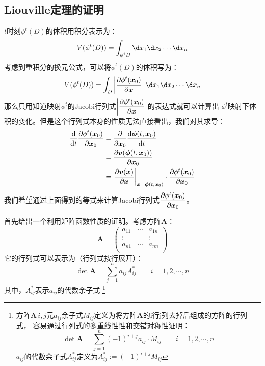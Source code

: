     \subsection{Liouville定理的证明}
    $t$时刻$\phi^t(D)$的体积用积分表示为：
    \begin{equation}
        V(\phi^t(D)) = \int_{\phi^t D}\d x_1\d x_2\cdots\d x_n
    \end{equation}
    考虑到重积分的换元公式，可以将$\phi^t(D)$的体积写为：
    \begin{equation}
        V(\phi^t(D)) = \int_{D}\left|\pdv{\phi^t(\bm{x}_0)}{\bm{x}}\right|\d x_1\d x_2\cdots\d x_n
        \label{volum of D}
    \end{equation}
    那么只用知道映射$\phi^t$的Jacobi行列式$\displaystyle\left|\frac{\partial{\phi^t(\bm{x}_0)}}{\partial{\bm{x}}}\right|$的表达式就可以计算出
    $\phi^t$映射下体积的变化。但是这个行列式本身的性质无法直接看出，我们对其求导：
    \begin{equation}
        \begin{split}
            \frac{\mathrm{d}{}}{\mathrm{d}{t}}\frac{\partial{\phi^t(\bm{x}_0)}}{\partial{\bm{x}_0}} &= \frac{\partial{}}{\partial{\bm{x}_0}}\frac{\mathrm{d}{\bm{\phi}(t, \bm{x}_0)}}{\mathrm{d}{t}}\\
            & = \frac{\partial{\bm{v}(\bm{\phi}(t, \bm{x}_0))}}{\partial{\bm{x}_0}}\\
            & = \left.\frac{\partial{\bm{v}(\bm{x})}}{\partial{\bm{x}}}\right|_{\bm{x}=\bm{\phi}(t, \bm{x}_0)}\cdot
            \frac{\partial{\phi^t(\bm{x}_0)}}{\partial{\bm{x}_0}}
        \end{split}
        \label{the equation of jacobian}
    \end{equation}
    我们希望通过上面得到的等式来计算Jacobi行列式$\displaystyle\frac{\partial{\phi^t(\bm{x}_0)}}{\partial{\bm{x}_0}}$。
    \par 
    首先给出一个利用矩阵函数性质的证明。考虑方阵$\bm{A}$：
    \begin{equation}
        \bm{A} = 
        \begin{pmatrix}
            a_{11} & \cdots & a_{1n}\\
            \vdots & & \vdots\\
            a_{n1} & \cdots & a_{nn}\\
        \end{pmatrix}
    \end{equation}
    它的行列式可以表示为（行列式按行展开）：
    \begin{equation}
        \det{\bm{A}} = \sum_{j=1}^na_{ij} A_{ij}^* \quad\quad i = 1, 2, \cdots, n
    \end{equation}
    其中，$A_{ij}^*$表示$a_{ij}$的代数余子式
    \footnote{方阵$\bm{A}\,$$i,j$元$a_{ij}$余子式$M_{ij}$定义为将方阵$\bm{A}$的i行j列去掉后组成的方阵的行列式，
    容易通过行列式的多重线性性和交错对称性证明：
    \begin{equation}
        \det \bm{A} = \sum_{j = 1}^{n}(-1)^{i + j}a_{ij}\cdot M_{ij}\quad \quad i = 1, 2, \cdots, n
    \end{equation}
    $a_{ij}$的代数余子式$A_{ij}^*$定义为$A_{ij}^* := (-1)^{i+j}M_{ij}$
    }
